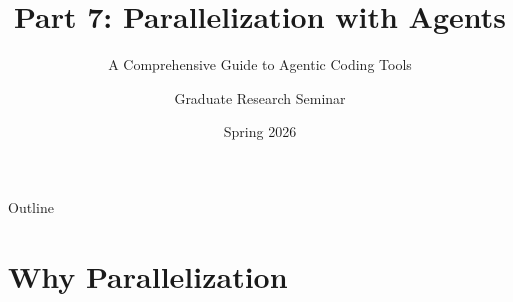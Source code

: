 \documentclass[aspectratio=169,11pt]{beamer}
\title[Part 7: Parallelization]{Part 7: Parallelization with Agents}
\subtitle{A Comprehensive Guide to Agentic Coding Tools}
\author{Graduate Research Seminar}
\institute{University of South Carolina}
\date{Spring 2026}
\begin{document}
\begin{frame}
    \titlepage
\end{frame}

\begin{frame}{Outline}
    \tableofcontents
\end{frame}

\section{Why Parallelization}
\end{document}
